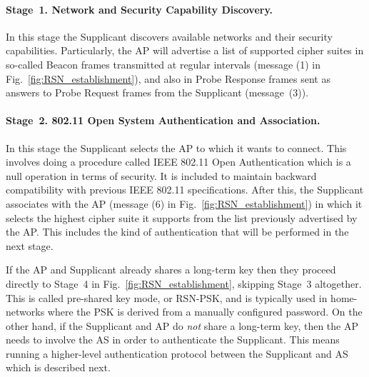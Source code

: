 \paragraph{Stage~1. Network and Security Capability Discovery.} 
In this stage the Supplicant discovers available networks and their security capabilities.
Particularly, the AP will advertise a list of supported cipher suites
in so-called Beacon frames transmitted at regular intervals (message (1) in Fig.~\ref{fig:RSN_establishment}),
and also in Probe Response frames sent as answers to Probe Request frames from the Supplicant (message~(3)). 

\paragraph{Stage~2. 802.11 Open System Authentication and Association.}
In this stage the Supplicant selects the AP to which it wants to connect.
This involves doing a procedure called IEEE 802.11 Open Authentication which is a null operation in terms of security.
It is included to maintain backward compatibility with previous IEEE 802.11 specifications.
After this, the Supplicant associates with the AP
(message (6) in Fig.~\ref{fig:RSN_establishment})
in which it selects the highest cipher suite it supports from the list previously advertised by the AP.
This includes the kind of authentication that will be performed in the next stage.

If the AP and Supplicant already shares a long-term key then they proceed directly to Stage~4 in Fig.~\ref{fig:RSN_establishment},
skipping Stage~3 altogether.
This is called pre-shared key mode, or RSN-PSK,
and is typically used in home-networks where the PSK is derived from a manually configured password.
On the other hand,
if the Supplicant and AP do \emph{not} share a long-term key,
then the AP needs to involve the AS in order to authenticate the Supplicant.
This means running a higher-level authentication protocol between the Supplicant and AS which is described next.



